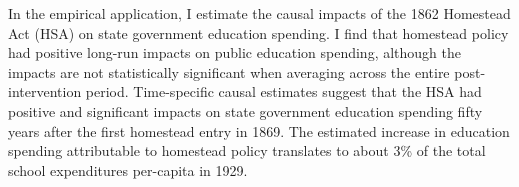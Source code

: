 In the empirical application, I estimate the causal impacts of the 1862 Homestead Act (HSA) on state government education spending. I find that homestead policy had positive long-run impacts on public education spending, although the impacts are not statistically significant when averaging across the entire post-intervention period. Time-specific causal estimates suggest that the HSA had positive and significant impacts on state government education spending fifty years after the first homestead entry in 1869. The estimated increase in education spending attributable to homestead policy translates to about 3\% of the total school expenditures per-capita in 1929.